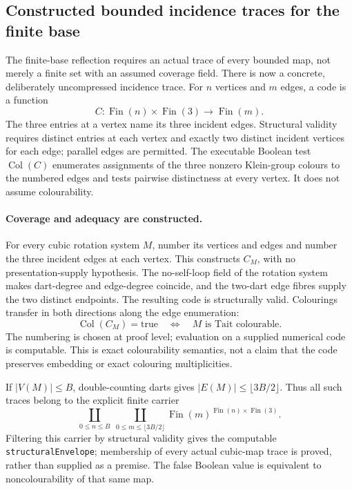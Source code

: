 \subsection{Constructed bounded incidence traces for the finite base}
\label{sec:bounded-cubic-colour-trace}

The finite-base reflection requires an actual trace of every bounded map,
not merely a finite set with an assumed coverage field. There is now a
concrete, deliberately uncompressed incidence trace. For $n$ vertices and
$m$ edges, a code is a function
\[
       C:\operatorname{Fin}(n)\times\operatorname{Fin}(3)
          \longrightarrow\operatorname{Fin}(m).
\]
The three entries at a vertex name its three incident edges. Structural
validity requires distinct entries at each vertex and exactly two distinct
incident vertices for each edge; parallel edges are permitted. The
executable Boolean test $\operatorname{Col}(C)$ enumerates assignments of
the three nonzero Klein-group colours to the numbered edges and tests
pairwise distinctness at every vertex. It does not assume colourability.

\paragraph{Coverage and adequacy are constructed.}
For every cubic rotation system $M$, number its vertices and edges and
number the three incident edges at each vertex. This constructs
$C_M$, with no presentation-supply hypothesis. The no-self-loop field of
the rotation system makes dart-degree and edge-degree coincide, and the
two-dart edge fibres supply the two distinct endpoints. The resulting code
is structurally valid.
Colourings transfer in both directions along the edge enumeration:
\[
        \operatorname{Col}(C_M)=\mathrm{true}
          \quad\Longleftrightarrow\quad M\text{ is Tait colourable}.
\]
The numbering is chosen at proof level; evaluation on a supplied numerical
code is computable. This is exact colourability semantics, not a claim that
the code preserves embedding or exact colouring multiplicities.

If $|V(M)|\le B$, double-counting darts gives
$|E(M)|\le\lfloor3B/2\rfloor$. Thus all such traces belong to the explicit
finite carrier
\[
 \coprod_{0\le n\le B}\;\coprod_{0\le m\le\lfloor3B/2\rfloor}
       \operatorname{Fin}(m)^{\operatorname{Fin}(n)\times\operatorname{Fin}(3)}.
\]
Filtering this carrier by structural validity gives the computable
\texttt{structuralEnvelope}; membership of every actual cubic-map trace
is proved, rather than supplied as a premise.
The false Boolean value is equivalent to noncolourability of that same map.

